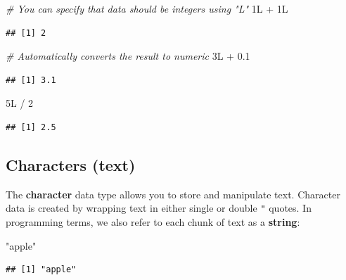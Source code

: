 \documentclass[
]{book}
\newenvironment{Shaded}{\begin{snugshade}}{\end{snugshade}}
\newcommand{\CommentTok}[1]{\textcolor[rgb]{0.56,0.35,0.01}{\textit{#1}}}
\newcommand{\DecValTok}[1]{\textcolor[rgb]{0.00,0.00,0.81}{#1}}
\newcommand{\FloatTok}[1]{\textcolor[rgb]{0.00,0.00,0.81}{#1}}
\newcommand{\NormalTok}[1]{#1}
\newcommand{\SpecialCharTok}[1]{\textcolor[rgb]{0.00,0.00,0.00}{#1}}
\newcommand{\StringTok}[1]{\textcolor[rgb]{0.31,0.60,0.02}{#1}}
\begin{document}
\begin{Shaded}
\begin{Highlighting}[]
\CommentTok{\# You can specify that data should be integers using "L"}
\NormalTok{1L }\SpecialCharTok{+}\NormalTok{ 1L}
\end{Highlighting}
\end{Shaded}

\begin{verbatim}
## [1] 2
\end{verbatim}

\begin{Shaded}
\begin{Highlighting}[]
\CommentTok{\# Automatically converts the result to numeric}
\NormalTok{3L }\SpecialCharTok{+} \FloatTok{0.1}
\end{Highlighting}
\end{Shaded}

\begin{verbatim}
## [1] 3.1
\end{verbatim}

\begin{Shaded}
\begin{Highlighting}[]
\NormalTok{5L }\SpecialCharTok{/} \DecValTok{2}
\end{Highlighting}
\end{Shaded}

\begin{verbatim}
## [1] 2.5
\end{verbatim}

\hypertarget{characters-text}{%
\subsection{Characters (text)}\label{characters-text}}

The \textbf{character} data type allows you to store and manipulate
text. Character data is created by wrapping text in either single \texttt{\textquotesingle{}} or
double \texttt{"} quotes. In programming terms, we also refer to each chunk of text
as a \textbf{string}:

\begin{Shaded}
\begin{Highlighting}[]
\StringTok{"apple"}
\end{Highlighting}
\end{Shaded}

\begin{verbatim}
## [1] "apple"
\end{verbatim}
\end{document}
